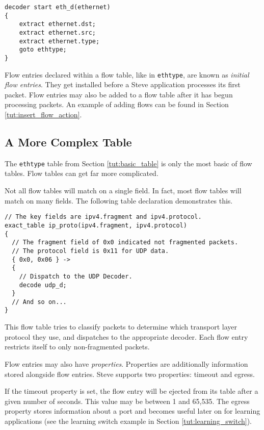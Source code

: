 \begin{codepage}
\begin{lstlisting}
decoder start eth_d(ethernet)
{
	extract ethernet.dst;
	extract ethernet.src;
	extract ethernet.type;
	goto ethtype;
}
\end{lstlisting}
\end{codepage}

Flow entries declared within a flow table, like in \texttt{ethtype}, are known
as \textit{initial flow entries}. They get installed before a Steve application
processes its first packet. Flow entries may also be added to a flow table after it has begun processing packets. An
example of adding flows can be found in Section \ref{tut:insert_flow_action}.

\subsection{A More Complex Table} \label{tut:complex_table}

The \texttt{ethtype} table from Section \ref{tut:basic_table} is only the most basic of flow tables. Flow tables can get
far more complicated.

Not all flow tables will match on a single field. In fact, most flow tables will
match on many fields. The following table declaration demonstrates this.

\begin{codepage}
\begin{lstlisting}
// The key fields are ipv4.fragment and ipv4.protocol.
exact_table ip_proto(ipv4.fragment, ipv4.protocol)
{
  // The fragment field of 0x0 indicated not fragmented packets.
  // The protocol field is 0x11 for UDP data.
  { 0x0, 0x06 } ->
  {
  	// Dispatch to the UDP Decoder.
  	decode udp_d;
  }
  // And so on...
}
\end{lstlisting}
\end{codepage}

This flow table tries to classify packets to determine which transport layer
protocol they use, and dispatches to the appropriate decoder.
Each flow entry restricts itself to only non-fragmented packets.

Flow entries may also have \textit{properties}. Properties are additionally
information stored alongside flow entries. Steve supports two properties:
timeout and egress.

If the timeout property is set, the flow entry will be ejected from its table
after a given number of seconds. This value may be between 1 and 65,535. The
egress property stores information about a port and becomes useful later on for learning
applications (see the learning switch example in Section
\ref{tut:learning_switch}).

